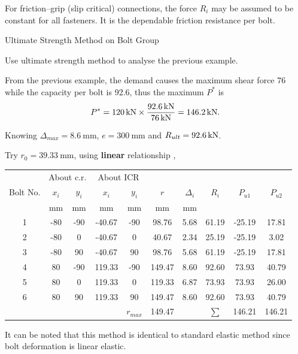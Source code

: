 For friction--grip (slip critical) connections, the force $R_i$ may be assumed to be constant for all fasteners.
It is the dependable friction resistance per bolt.
\begin{exmp}
Ultimate Strength Method on Bolt Group

Use ultimate strength method to analyse the previous example.
\end{exmp}
\begin{solution}
From the previous example, the demand causes the maximum shear force \SI{76}{\kn} while the capacity per bolt is \SI{92.6}{\kn}, thus the maximum $P^*$ is
\begin{gather*}
P^*=\SI{120}{\kilo\newton}\times\dfrac{\SI{92.6}{\kilo\newton}}{\SI{76}{\kilo\newton}}=\SI{146.2}{\kilo\newton}.
\end{gather*}

Knowing $\Delta_{max}=\SI{8.6}{\mm}$, $e=\SI{300}{\mm}$ and $R_{ult}=\SI{92.6}{\kilo\newton}$.

Try $r_0=\SI{39.33}{\mm}$, using \textbf{linear} relationship ,
\begin{table}[H]
\centering
\begin{tabular}{cccccccccc}
	\toprule
	         & \multicolumn{2}{c}{About c.r.} & \multicolumn{2}{c}{About ICR} &          &            &          &          &          \\
	Bolt No. &  $x_i$   &        $y_i$        &  $x_i$   &       $y_i$        &   $r$    & $\Delta_i$ &  $R_i$   & $P_{u1}$ & $P_{u2}$ \\
	         & \si{\mm} &      \si{\mm}       & \si{\mm} &      \si{\mm}      & \si{\mm} &  \si{\mm}  & \si{\kn} & \si{\kn} & \si{\kn} \\ \midrule
	   1     &   -80    &         -90         &  -40.67  &        -90         &  98.76   &    5.68    &  61.19   &  -25.19  &  17.81   \\
	   2     &   -80    &          0          &  -40.67  &         0          &  40.67   &    2.34    &  25.19   &  -25.19  &   3.02   \\
	   3     &   -80    &         90          &  -40.67  &         90         &  98.76   &    5.68    &  61.19   &  -25.19  &  17.81   \\
	   4     &    80    &         -90         &  119.33  &        -90         &  149.47  &    8.60    &  92.60   &  73.93   &  40.79   \\
	   5     &    80    &          0          &  119.33  &         0          &  119.33  &    6.87    &  73.93   &  73.93   &  26.00   \\
	   6     &    80    &         90          &  119.33  &         90         &  149.47  &    8.60    &  92.60   &  73.93   &  40.79   \\ \bottomrule
	         &          &                     &          &     $r_{max}$      &  149.47  &            &  $\sum$  &  146.21  &  146.21
\end{tabular}
\end{table}
It can be noted that this method is identical to standard elastic method since bolt deformation is linear elastic.


\end{solution}

